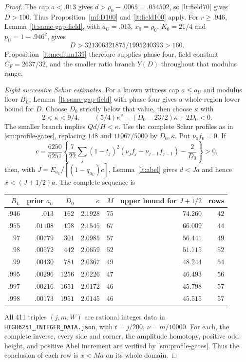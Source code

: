 \documentclass[11pt,reqno]{amsart}
\numberwithin{equation}{section}
\theoremstyle{definition}
\theoremstyle{remark}
\DeclareRobustCommand{\cert}[1]{\nolinkurl{#1}}
\begin{document}
\begin{proof}
The cap $a<.013$ gives $d>\rho_0-.0065=.054502$, so
\eqref{lt:field70} gives $D>100$.
Thus Proposition~\ref{mf:D100} and \eqref{lt:field100} apply.
For $r\ge.946$,
Lemma~\ref{lt:same-gap-field}, with $a_U=.013$, $x_0=\rho_0$,
$K_0=21/4$ and $p_U=1-.946^2$, gives
\[
 D>321306321875/1995240393>160.
\]
Proposition~\ref{lt:medium139} therefore supplies phase four,
field constant $C_F=2637/32$, and the smaller ratio branch $Y(D)$
throughout that modulus range.

\smallskip\noindent\emph{Eight successive Schur estimates.}
For a known witness cap $a\le a_U$ and modulus floor $B_L$,
Lemma~\ref{lt:same-gap-field} with phase four gives a whole-region
lower bound for $D$. Choose $D_0$ strictly below that value, then
choose $\kappa$ with
\[
 2<\kappa<9/4,\qquad
 (5/4)\kappa^2-(D_0-23/2)\kappa+2D_0<0.
\]
The smaller branch implies $Qd/H<\kappa$.
Use the complete Schur profiles as in
\eqref{sm:profile-gates}, replacing $148$ and $11067/5000$ by
$D_0,\kappa$. Put $\nu_0f_0=0$. If
\[
 c=\frac{6250}{6251}\left\{
 \frac7{22}\sum_j(1-t_j)^2(\nu_jf_j-\nu_{j-1}f_{j-1})
 -\frac2{D_0}\right\}>0,
\]
then, with $J=E_{a_U}/[(1-q_{a_U})c]$, Lemma~\ref{lt:abel}
gives $d<Ja$ and hence
$x<(J+1/2)a$. The complete sequence is
\begin{center}\small
\begin{tabular}{rrrrrrr}
\toprule
$B_L$&prior $a_U$&$D_0$&$\kappa$&$M$&upper bound for $J+1/2$&rows\\\midrule
$.946$&$.013$&$162$&$2.1928$&$75$&$74.260$&$42$\\
$.955$&$.01108$&$198$&$2.1545$&$67$&$66.009$&$44$\\
$.97$&$.00779$&$301$&$2.0985$&$57$&$56.441$&$49$\\
$.98$&$.00572$&$442$&$2.0659$&$52$&$51.715$&$52$\\
$.99$&$.00430$&$781$&$2.0367$&$49$&$48.244$&$54$\\
$.995$&$.00296$&$1256$&$2.0226$&$47$&$46.493$&$56$\\
$.997$&$.00216$&$1651$&$2.0172$&$46$&$45.798$&$57$\\
$.998$&$.00173$&$1951$&$2.0145$&$46$&$45.515$&$57$\\\bottomrule
\end{tabular}
\end{center}
All 411 triples $(j,m,W)$ are rational integer data in
\cert{HIGH6251_INTEGER_DATA.json}, with $t=j/200$,
$\nu=m/10000$. For each, the complete inverse, every side and
corner, the amplitude homotopy, positive odd height, and positive
Abel increment are verified by \eqref{sm:profile-gates}.
Thus the conclusion of each row is $x<Ma$ on its whole domain.


\end{proof}
\end{document}
